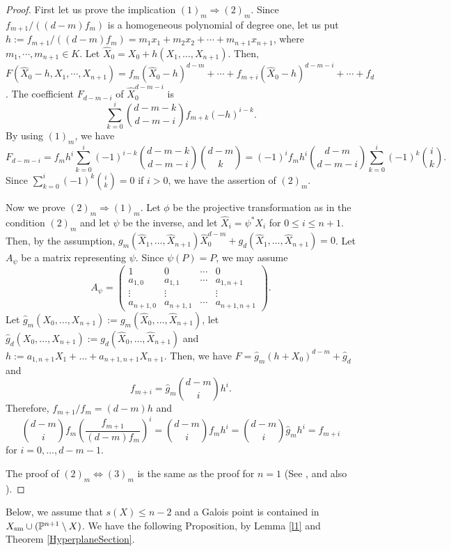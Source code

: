 \documentclass[10pt,oneside]{amsart}
\theoremstyle{definition}
\begin{document}
\begin{proof}
First let us prove the implication $(1)_m \Rightarrow (2)_m$. 
Since $f_{m+1}/((d-m)f_m)$ is a homogeneous polynomial of degree one, let us put $h:=f_{m+1}/((d-m)f_m)=m_{1}x_1+m_{2}x_2+ \cdots + m_{n+1}x_{n+1}$, where $m_{1}, \cdots, m_{n+1} \in K$. 
Let $\hat{X}_0=X_0+h(X_1, \ldots, X_{n+1})$. 
Then,
$F(\hat{X}_0-h, X_1, \cdots, X_{n+1})=f_m(\hat{X}_0-h)^{d-m}+\cdots+f_{m+i}(\hat{X}_0-h)^{d-m-i}+\cdots+f_d$. 
The coefficient $F_{d-m-i}$ of $\hat{X}_0^{d-m-i}$ is 
$$ \sum_{k=0}^i \binom{d-m-k}{d-m-i} f_{m+k}(-h)^{i-k}. $$
By using $(1)_m$, we have 
$$ F_{d-m-i}=f_mh^i\sum_{k=0}^i(-1)^{i-k}\binom{d-m-k}{d-m-i} \binom{d-m}{k} = (-1)^i f_mh^i \binom{d-m}{d-m-i} \sum_{k=0}^i(-1)^{k} \binom{i}{k}. $$ 
Since $\sum_{k=0}^i(-1)^{k} \binom{i}{k}=0$ if $i>0$, we have the assertion of $(2)_m$. 

Now we prove $(2)_m \Rightarrow (1)_m$. 
Let $\phi$ be the projective transformation as in the condition $(2)_m$ and let $\psi$ be the inverse, and let $\hat{X}_i=\psi^*X_i$ for $0 \le i \le n+1$. 
Then, by the assumption, $g_m(\hat{X}_1, \ldots, \hat{X}_{n+1})\hat{X}_0^{d-m}+g_d(\hat{X}_1, \ldots, \hat{X}_{n+1})=0$. 
Let $A_{\psi}$ be a matrix representing $\psi$. 
Since $\psi(P)=P$, we may assume 
$$ A_{\psi}= \begin{pmatrix} 1 & 0 & \cdots & 0 \\
                   a_{1,0} & a_{1,1} & \cdots & a_{1, n+1} \\
                   \vdots & \vdots & & \vdots \\
                   a_{n+1, 0}& a_{n+1, 1} & \cdots & a_{n+1, n+1} 
\end{pmatrix}.$$
Let $\hat{g}_m(X_0,\dots, X_{n+1}):=g_m(\hat{X}_0, \ldots, \hat{X}_{n+1})$, let $\hat{g}_d(X_0, \ldots, X_{n+1}):=g_d(\hat{X}_0, \ldots, \hat{X}_{n+1})$ and $h:=a_{1, n+1}X_1+\dots+a_{n+1, n+1}X_{n+1}$. 
Then, we have $F=\hat{g}_m(h+X_0)^{d-m}+\hat{g}_d$ and 
$$ f_{m+i}=\hat{g}_m \binom{d-m}{i} h^i.  $$ 
Therefore, $f_{m+1}/f_m=(d-m)h$ and 
$$ \binom{d-m}{i} f_m \left(\frac{f_{m+1}}{(d-m)f_m}\right)^i
= \binom{d-m}{i} f_m h^i = \binom{d-m}{i} \hat{g}_m h^i=f_{m+i} $$
for $i=0, \ldots, d-m-1$. 

The proof of $(2)_m \Leftrightarrow (3)_m$ is the same as the proof for $n=1$ (See \cite[Proposition 1]{yoshihara4}, and also \cite[Proposition 4]{miura}).  
\end{proof}

Below, we assume that $s(X) \le n-2$ and a Galois point is contained in $X_{\rm sm} \cup (\Bbb P^{n+1} \setminus X)$. 
We have the following Proposition, by Lemma \ref{l1} and Theorem \ref{HyperplaneSection}. 
\end{document}
